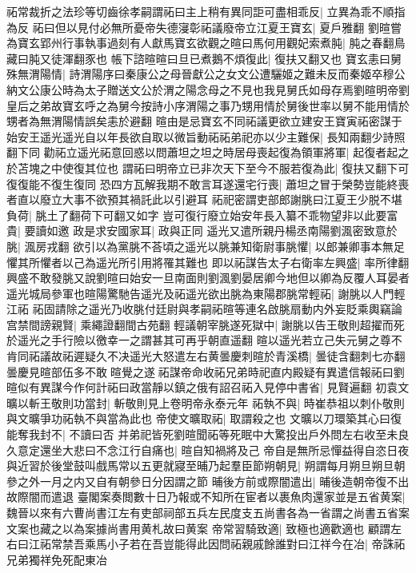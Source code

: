 祏常裁折之法珍等切齒徐孝嗣謂祏曰主上稍有異同詎可盡相乖反|{
	立異為乖不順指為反}
祏曰但以見付必無所憂帝失德寖彰祏議廢帝立江夏王寶玄|{
	夏戶雅翻}
劉暄嘗為寶玄郢州行事執事過刻有人獻馬寶玄欲觀之暄曰馬何用觀妃索煮肫|{
	肫之春翻鳥藏曰肫又徒渾翻豕也}
帳下諮暄暄曰旦已煮鵝不煩復此|{
	復扶又翻又也}
寶玄恚曰舅殊無渭陽情|{
	詩渭陽序曰秦康公之母晉獻公之女文公遭驪姬之難未反而秦姬卒穆公納文公康公時為太子贈送文公於渭之陽念母之不見也我見舅氏如母存焉劉暄明帝劉皇后之弟故寶玄呼之為舅今按詩小序渭陽之事乃甥用情於舅後世率以舅不能用情於甥者為無渭陽情誤矣恚於避翻}
暄由是忌寶玄不同祏議更欲立建安王寶寅祏密謀于始安王遥光遥光自以年長欲自取以微旨動祏祏弟祀亦以少主難保|{
	長知兩翻少詩照翻下同}
勸祏立遥光祏意回惑以問蕭坦之坦之時居母喪起復為領軍將軍|{
	起復者起之於苫塊之中使復其位也}
謂祏曰明帝立已非次天下至今不服若復為此|{
	復扶又翻下可復復能不復生復同}
恐四方瓦解我期不敢言耳遂還宅行喪|{
	蕭坦之冒于榮勢豈能終喪者直以廢立大事不欲預其禍託此以引避耳}
祏祀密謂吏部郎謝朓曰江夏王少脱不堪負荷|{
	朓土了翻荷下可翻又如字}
豈可復行廢立始安年長入纂不乖物望非以此要富貴|{
	要讀如邀}
政是求安國家耳|{
	政與正同}
遥光又遣所親丹楊丞南陽劉渢密致意於朓|{
	渢房戎翻}
欲引以為黨朓不荅頃之遥光以脁兼知衛尉事脁懼|{
	以郎兼卿事本無足懼其所懼者以己為遥光所引用將罹其難也}
即以祏謀告太子右衛率左興盛|{
	率所律翻}
興盛不敢發朓又說劉暄曰始安一旦南面則劉渢劉晏居卿今地但以卿為反覆人耳晏者遥光城局參軍也暄陽驚馳告遥光及祏遥光欲出脁為東陽郡脁常輕祏|{
	謝朓以人門輕江祏}
祏固請除之遥光乃收朓付廷尉與孝嗣祏暄等連名啟朓扇動内外妄貶乘輿竊論宫禁間謗親賢|{
	乘繩證翻間古苑翻}
輕議朝宰朓遂死獄中|{
	謝朓以告王敬則超擢而死於遥光之手行險以徼幸一之謂甚其可再乎朝直遥翻}
暄以遥光若立己失元舅之尊不肯同祏議故祏遲疑久不决遥光大怒遣左右黄曇慶刺暄於青溪橋|{
	曇徒含翻刺七亦翻}
曇慶見暄部伍多不敢暄覺之遂祏謀帝命收祏兄弟時祀直内殿疑有異遣信報祏曰劉暄似有異謀今作何計祏曰政當靜以鎮之俄有詔召祏入見停中書省|{
	見賢遍翻}
初袁文曠以斬王敬則功當封|{
	斬敬則見上卷明帝永泰元年}
祏執不與|{
	時崔恭祖以刺仆敬則與文曠爭功祏執不與當為此也}
帝使文曠取祏|{
	取謂殺之也}
文曠以刀環築其心曰復能奪我封不|{
	不讀曰否}
并弟祀皆死劉暄聞祏等死眠中大驚投出戶外問左右收至未良久意定還坐大悲曰不念江行自痛也|{
	暄自知禍將及己}
帝自是無所忌憚益得自恣日夜與近習於後堂鼓叫戲馬常以五更就寢至晡乃起羣臣節朔朝見|{
	朔謂每月朔旦朔旦朝參之外一月之内又自有朝參日分因謂之節}
晡後方前或際闇遣出|{
	晡後造朝帝復不出故際闇而遣退}
臺閣案奏閲數十日乃報或不知所在宦者以裹魚肉還家並是五省黄案|{
	魏晉以來有六曹尚書江左有吏部祠部五兵左民度支五尚書各為一省謂之尚書五省案文案也藏之以為案據尚書用黄札故曰黄案}
帝常習騎致適|{
	致極也適歡適也}
顧謂左右曰江祏常禁吾乘馬小子若在吾豈能得此因問祏親戚餘誰對曰江祥今在冶|{
	帝誅祏兄弟獨祥免死配東冶}

